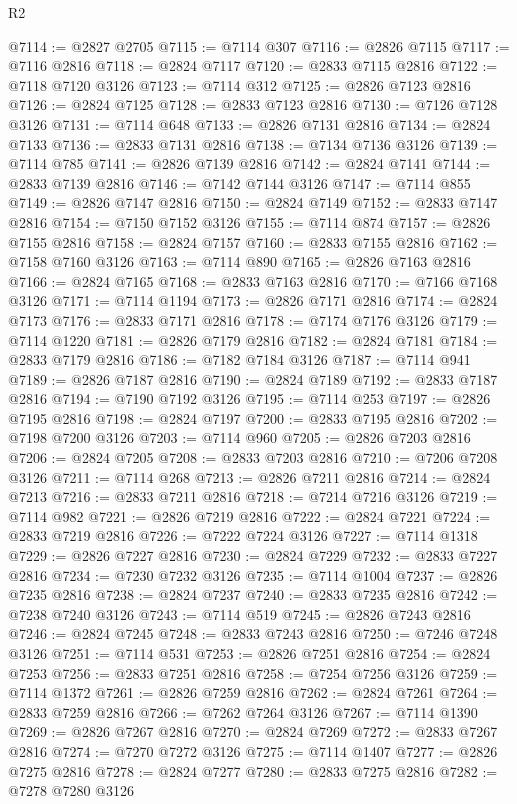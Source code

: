 \begin{lexlean}{R2}
\begin{coremodule}
@7114 := @2827 @2705
@7115 := @7114 @307
@7116 := @2826 @7115
@7117 := @7116 @2816
@7118 := @2824 @7117
@7120 := @2833 @7115 @2816
@7122 := @7118 @7120 @3126
@7123 := @7114 @312
@7125 := @2826 @7123 @2816
@7126 := @2824 @7125
@7128 := @2833 @7123 @2816
@7130 := @7126 @7128 @3126
@7131 := @7114 @648
@7133 := @2826 @7131 @2816
@7134 := @2824 @7133
@7136 := @2833 @7131 @2816
@7138 := @7134 @7136 @3126
@7139 := @7114 @785
@7141 := @2826 @7139 @2816
@7142 := @2824 @7141
@7144 := @2833 @7139 @2816
@7146 := @7142 @7144 @3126
@7147 := @7114 @855
@7149 := @2826 @7147 @2816
@7150 := @2824 @7149
@7152 := @2833 @7147 @2816
@7154 := @7150 @7152 @3126
@7155 := @7114 @874
@7157 := @2826 @7155 @2816
@7158 := @2824 @7157
@7160 := @2833 @7155 @2816
@7162 := @7158 @7160 @3126
@7163 := @7114 @890
@7165 := @2826 @7163 @2816
@7166 := @2824 @7165
@7168 := @2833 @7163 @2816
@7170 := @7166 @7168 @3126
@7171 := @7114 @1194
@7173 := @2826 @7171 @2816
@7174 := @2824 @7173
@7176 := @2833 @7171 @2816
@7178 := @7174 @7176 @3126
@7179 := @7114 @1220
@7181 := @2826 @7179 @2816
@7182 := @2824 @7181
@7184 := @2833 @7179 @2816
@7186 := @7182 @7184 @3126
@7187 := @7114 @941
@7189 := @2826 @7187 @2816
@7190 := @2824 @7189
@7192 := @2833 @7187 @2816
@7194 := @7190 @7192 @3126
@7195 := @7114 @253
@7197 := @2826 @7195 @2816
@7198 := @2824 @7197
@7200 := @2833 @7195 @2816
@7202 := @7198 @7200 @3126
@7203 := @7114 @960
@7205 := @2826 @7203 @2816
@7206 := @2824 @7205
@7208 := @2833 @7203 @2816
@7210 := @7206 @7208 @3126
@7211 := @7114 @268
@7213 := @2826 @7211 @2816
@7214 := @2824 @7213
@7216 := @2833 @7211 @2816
@7218 := @7214 @7216 @3126
@7219 := @7114 @982
@7221 := @2826 @7219 @2816
@7222 := @2824 @7221
@7224 := @2833 @7219 @2816
@7226 := @7222 @7224 @3126
@7227 := @7114 @1318
@7229 := @2826 @7227 @2816
@7230 := @2824 @7229
@7232 := @2833 @7227 @2816
@7234 := @7230 @7232 @3126
@7235 := @7114 @1004
@7237 := @2826 @7235 @2816
@7238 := @2824 @7237
@7240 := @2833 @7235 @2816
@7242 := @7238 @7240 @3126
@7243 := @7114 @519
@7245 := @2826 @7243 @2816
@7246 := @2824 @7245
@7248 := @2833 @7243 @2816
@7250 := @7246 @7248 @3126
@7251 := @7114 @531
@7253 := @2826 @7251 @2816
@7254 := @2824 @7253
@7256 := @2833 @7251 @2816
@7258 := @7254 @7256 @3126
@7259 := @7114 @1372
@7261 := @2826 @7259 @2816
@7262 := @2824 @7261
@7264 := @2833 @7259 @2816
@7266 := @7262 @7264 @3126
@7267 := @7114 @1390
@7269 := @2826 @7267 @2816
@7270 := @2824 @7269
@7272 := @2833 @7267 @2816
@7274 := @7270 @7272 @3126
@7275 := @7114 @1407
@7277 := @2826 @7275 @2816
@7278 := @2824 @7277
@7280 := @2833 @7275 @2816
@7282 := @7278 @7280 @3126

\end{coremodule}
\end{lexlean}
